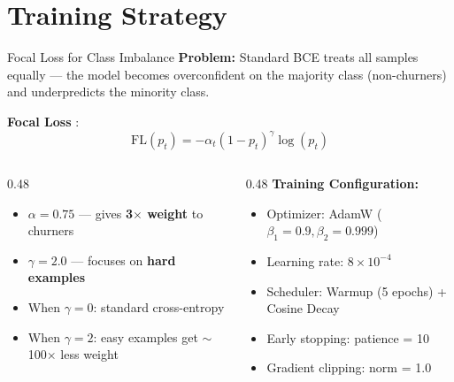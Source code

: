 \documentclass[aspectratio=169,11pt]{beamer}
\begin{document}
\section{Training Strategy}

\begin{frame}{Focal Loss for Class Imbalance}
\textbf{Problem:} Standard BCE treats all samples equally — the model becomes overconfident on the majority class (non-churners) and underpredicts the minority class.
\vspace{6pt}

\textbf{Focal Loss} \cite{lin2017}:
\[
\text{FL}(p_t) = -\alpha_t (1 - p_t)^{\gamma} \log(p_t)
\]
\vspace{2pt}
\begin{columns}[T]
\begin{column}{0.48\textwidth}
\begin{itemize}
    \item $\alpha = 0.75$ — gives \textbf{3$\times$ weight} to churners
    \item $\gamma = 2.0$ — focuses on \textbf{hard examples}
    \item When $\gamma = 0$: standard cross-entropy
    \item When $\gamma = 2$: easy examples get $\sim$100$\times$ less weight
\end{itemize}
\end{column}
\begin{column}{0.48\textwidth}
\textbf{Training Configuration:}
\begin{itemize}
    \item Optimizer: AdamW ($\beta_1{=}0.9, \beta_2{=}0.999$)
    \item Learning rate: $8 \times 10^{-4}$
    \item Scheduler: Warmup (5 epochs) + Cosine Decay
    \item Early stopping: patience = 10
    \item Gradient clipping: norm = 1.0
\end{itemize}
\end{column}
\end{columns}
\end{frame}
\end{document}
